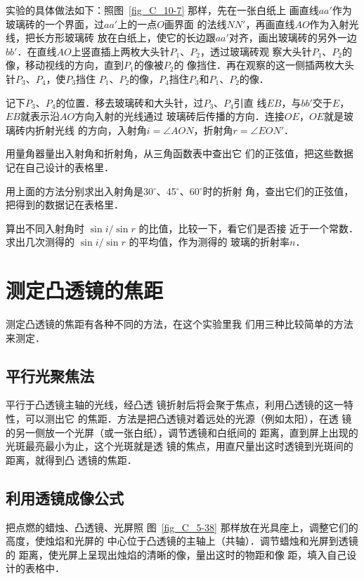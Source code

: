 实验的具体做法如下：照图~\ref{fig_C_10-7} 那样，先在一张白纸上
画直线$aa'$作为玻璃砖的一个界面，过$aa'$上的一点$O$画界面
的法线$NN'$，再画直线$AO$作为入射光线，把长方形玻璃砖
放在白纸上，使它的长边跟$aa'$对齐，画出玻璃砖的另外一边
$bb'$．在直线$AO$上竖直插上两枚大头针$P_1$、$P_2$，透过玻璃砖观
察大头针$P_1$、$P_2$的像，移动视线的方向，直到$P_1$的像被$P_2$的
像挡住．再在观察的这一侧插两枚大头针$P_3$、$P_4$，使$P_3$挡住
$P_1$、$P_2$的像，$P_4$挡住$P_3$和$P_1$、$P_2$的像．


记下$P_3$、$P_4$的位置．移去玻璃砖和大头针，过$P_3$、$P_4$引直
线$EB$，与$bb'$交于$E$，$EB$就表示沿$AO$方向入射的光线通过
玻璃砖后传播的方向．连接$OE$，$OE$就是玻璃砖内折射光线
的方向，入射角$i=\angle AON$，折射角$r=\angle EON'$．

用量角器量出入射角和折射角，从三角函数表中查出它
们的正弦值，把这些数据记在自己设计的表格里．

用上面的方法分别求出入射角是30$^\circ$、45$^\circ$、60$^\circ$时的折射
角，查出它们的正弦值，把得到的数据记在表格里．

算出不同入射角时
$\sin i/\sin r$
的比值，比较一下，看它们是否接
近于一个常数．求出几次测得的
$\sin i/\sin r$
的平均值，作为测得的
玻璃的折射率$n$．

\section{测定凸透镜的焦距}
测定凸透镜的焦距有各种不同的方法，在这个实验里我
们用三种比较简单的方法来测定．

\subsection{平行光聚焦法}

平行于凸透镜主轴的光线，经凸透
镜折射后将会聚于焦点，利用凸透镜的这一特性，可以测出它
的焦距．方法是把凸透镜对着远处的光源（例如太阳），在透
镜的另一侧放一个光屏（或一张白纸），调节透镜和白纸间的
距离，直到屏上出现的光斑最亮最小为止，这个光斑就是透
镜的焦点，用直尺量出这时透镜到光斑间的距离，就得到凸
透镜的焦距．

\subsection{利用透镜成像公式}

把点燃的蜡烛、凸透镜、光屏照
图~\ref{fig_C_5-38} 那样放在光具座上，调整它们的高度，使烛焰和光屏的
中心位于凸透镜的主轴上（共轴）．调节蜡烛和光屏到透镜的
距离，使光屏上呈现出烛焰的清晰的像，量出这时的物距和像
距，填入自己设计的表格中．

